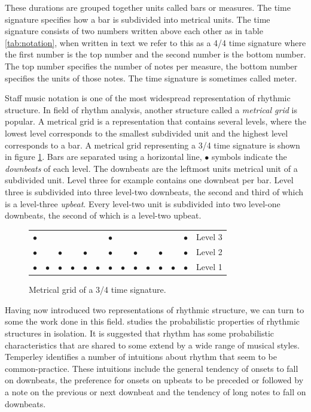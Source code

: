 These durations are grouped together units called bars or measures. The time signature specifies how a bar is subdivided into metrical units. The time signature consists of two numbers written above each other as in table \ref{tab:notation}, when written in text we refer to this as a 4/4 time signature where the first number is the top number and the second number is the bottom number. The top number specifies the number of notes per measure, the bottom number specifies the units of those notes. The time signature is sometimes called meter.

Staff music notation is one of the most widespread representation of rhythmic structure. In field of rhythm analysis, another structure called a \textit{metrical grid} is popular. A metrical grid is a representation that contains several levels, where the lowest level corresponds to the smallest subdivided unit and the highest level corresponds to a bar. A metrical grid representing a 3/4 time signature is shown in figure \ref{fig:grid}. Bars are separated using a horizontal line, $\bullet$ symbols indicate the \textit{downbeats} of each level. The downbeats are the leftmost units metrical unit of a subdivided unit. Level three for example contains one downbeat per bar. Level three is subdivided into three level-two downbeats, the second and third of which is a level-three \textit{upbeat}. Every level-two unit is subdivided into two level-one downbeats, the second of which is a level-two upbeat. 

\begin{figure}
\centering
\hspace{2in}
\begin{tabular}{llllll|llllll|ll}
$\bullet$ &  &  &  &  &  & 		$\bullet$ &  &  &  &  &  & $\bullet$ & Level 3\\ 
$\bullet$ &  & 	$\bullet$ &  & 	$\bullet$ & & 	$\bullet$ & & $\bullet$ &  & $\bullet$ &  & $\bullet$ & Level 2\\
$\bullet$ & 		$\bullet$ & 		$\bullet$ & 		$\bullet$ & $\bullet$ & $\bullet$ & $\bullet$ & $\bullet$ & $\bullet$ & $\bullet$ & $\bullet$ & $\bullet$ & $\bullet$ & Level 1\\
\end{tabular}
\caption{Metrical grid of a 3/4 time signature.}
\label{fig:grid}
\end{figure}

Having now introduced two representations of rhythmic structure, we can turn to some the work done in this field.\cite{temperley2010modeling} studies the probabilistic properties of rhythmic structures in isolation. It is suggested that rhythm has some probabilistic characteristics that are shared to some extend by a wide range of musical styles. Temperley identifies a number of intuitions about rhythm that seem to be common-practice. These intuitions include the general tendency of onsets to fall on downbeats, the preference for onsets on upbeats to be preceded or followed by a note on the previous or next downbeat and the tendency of long notes to fall on downbeats. 


